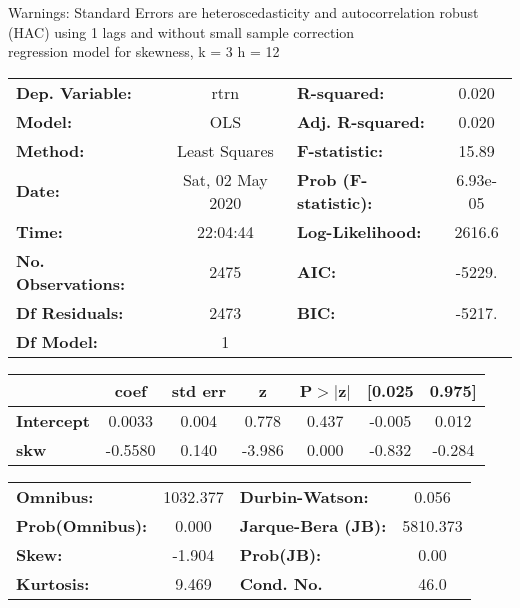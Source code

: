 Warnings: \newline
 [1] Standard Errors are heteroscedasticity and autocorrelation robust (HAC) using 1 lags and without small sample correction\\ 

regression model for skewness, k = 3 h = 12\begin{center}
\begin{tabular}{lclc}
\toprule
\textbf{Dep. Variable:}    &       rtrn       & \textbf{  R-squared:         } &     0.020   \\
\textbf{Model:}            &       OLS        & \textbf{  Adj. R-squared:    } &     0.020   \\
\textbf{Method:}           &  Least Squares   & \textbf{  F-statistic:       } &     15.89   \\
\textbf{Date:}             & Sat, 02 May 2020 & \textbf{  Prob (F-statistic):} &  6.93e-05   \\
\textbf{Time:}             &     22:04:44     & \textbf{  Log-Likelihood:    } &    2616.6   \\
\textbf{No. Observations:} &        2475      & \textbf{  AIC:               } &    -5229.   \\
\textbf{Df Residuals:}     &        2473      & \textbf{  BIC:               } &    -5217.   \\
\textbf{Df Model:}         &           1      & \textbf{                     } &             \\
\bottomrule
\end{tabular}
\begin{tabular}{lcccccc}
                   & \textbf{coef} & \textbf{std err} & \textbf{z} & \textbf{P$> |$z$|$} & \textbf{[0.025} & \textbf{0.975]}  \\
\midrule
\textbf{Intercept} &       0.0033  &        0.004     &     0.778  &         0.437        &       -0.005    &        0.012     \\
\textbf{skw}       &      -0.5580  &        0.140     &    -3.986  &         0.000        &       -0.832    &       -0.284     \\
\bottomrule
\end{tabular}
\begin{tabular}{lclc}
\textbf{Omnibus:}       & 1032.377 & \textbf{  Durbin-Watson:     } &    0.056  \\
\textbf{Prob(Omnibus):} &   0.000  & \textbf{  Jarque-Bera (JB):  } & 5810.373  \\
\textbf{Skew:}          &  -1.904  & \textbf{  Prob(JB):          } &     0.00  \\
\textbf{Kurtosis:}      &   9.469  & \textbf{  Cond. No.          } &     46.0  \\
\bottomrule
\end{tabular}
\end{center}

